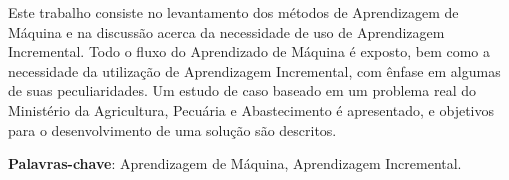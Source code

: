 \begin{resumo}
Este trabalho consiste no levantamento dos métodos de Aprendizagem de Máquina e na discussão acerca da necessidade de uso de Aprendizagem Incremental. Todo o fluxo do Aprendizado de Máquina é exposto, bem como a necessidade da utilização de Aprendizagem Incremental, com ênfase em algumas de suas peculiaridades. Um estudo de caso baseado em um problema real do Ministério da Agricultura, Pecuária e Abastecimento é apresentado, e objetivos para o desenvolvimento de uma solução são descritos.


\vspace{\onelineskip}
    
 \noindent
 \textbf{Palavras-chave}: Aprendizagem de Máquina, Aprendizagem Incremental.

\end{resumo}
